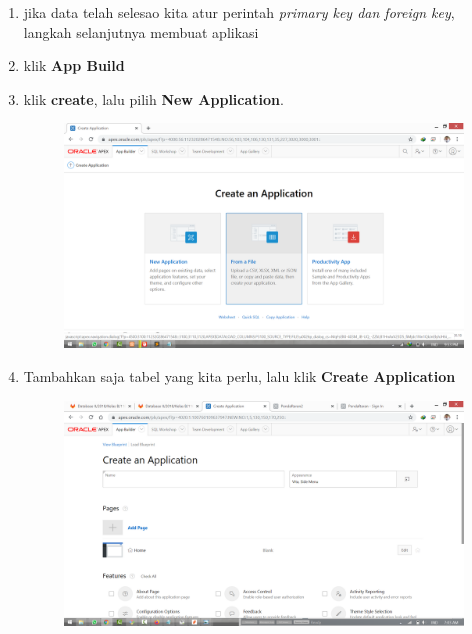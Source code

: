 \documentclass[11pt]{article}
\begin{document}
\begin{enumerate}
\item 
jika data telah selesao kita atur perintah \textit{primary key dan foreign key}, langkah selanjutnya membuat aplikasi

\item klik \textbf{App Build}
\item klik \textbf{create}, lalu pilih \textbf{New Application}.
	\begin{figure}[h]
        \centerline{\includegraphics[scale=0.1]{img/4.png}}
        \centering
        \caption{}
		\label{langkah25}
	\end{figure}

\newpage
\item Tambahkan saja tabel yang kita perlu, lalu klik \textbf{Create Application}
	\begin{figure}[h]
        \centerline{\includegraphics[scale=0.1]{img/b3.png}}
        \centering
        \caption{}
		\label{langkah26}
	\end{figure}


\end{enumerate}
\end{document}
